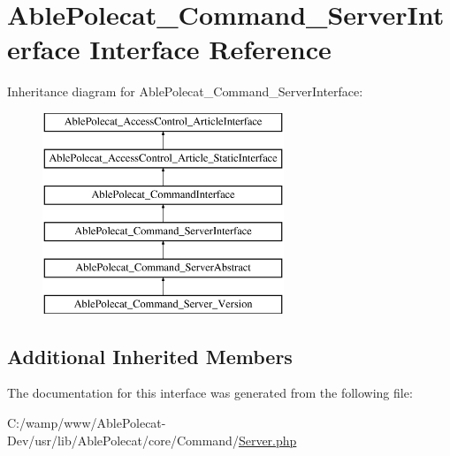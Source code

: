 \hypertarget{interface_able_polecat___command___server_interface}{}\section{Able\+Polecat\+\_\+\+Command\+\_\+\+Server\+Interface Interface Reference}
\label{interface_able_polecat___command___server_interface}
Inheritance diagram for Able\+Polecat\+\_\+\+Command\+\_\+\+Server\+Interface\+:\begin{figure}[H]
\begin{center}
\leavevmode
\includegraphics[height=6.000000cm]{interface_able_polecat___command___server_interface}
\end{center}
\end{figure}
\subsection*{Additional Inherited Members}


The documentation for this interface was generated from the following file\+:\begin{DoxyCompactItemize}
\item 
C\+:/wamp/www/\+Able\+Polecat-\/\+Dev/usr/lib/\+Able\+Polecat/core/\+Command/\hyperlink{_command_2_server_8php}{Server.\+php}\end{DoxyCompactItemize}
